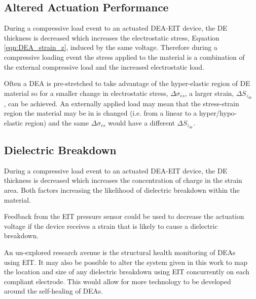 

\subsection{Altered Actuation Performance}
During a compressive load event to an actuated DEA-EIT device, the DE thickness is decreased which increases the electrostatic stress, Equation \ref{eqn:DEA_strain_z}, induced by the same voltage. Therefore during a compressive loading event the stress applied to the material is a combination of the external compressive load and the increased electrostatic load. 

Often a DEA is pre-stretched to take advantage of the hyper-elastic region of DE material so for a smaller change in electrostatic stress, $\Delta\sigma_{es}$, a larger strain, $\Delta S_{z_{de}}$, can be achieved. An externally applied load may mean that the stress-strain region the material may be in is changed (i.e. from a linear to a hyper/hypo-elastic region) and the same $\Delta\sigma_{es}$ would have a different $\Delta S_{z_{de}}$.

\subsection{Dielectric Breakdown}
During a compressive load event to an actuated DEA-EIT device, the DE thickness is decreased which increases the concentration of charge in the strain area. Both factors increasing the likelihood of dielectric breakdown within the material.

Feedback from the EIT pressure sensor could be used to decrease the actuation voltage if the device receives a strain that is likely to cause a dielectric breakdown.

An un-explored research avenue is the structural health monitoring of DEAs using EIT. It may also be possible to alter the system given in this work to map the location and size of any dielectric breakdown using EIT concurrently on each compliant electrode. This would allow for more technology to be developed around the self-healing of DEAs. 



